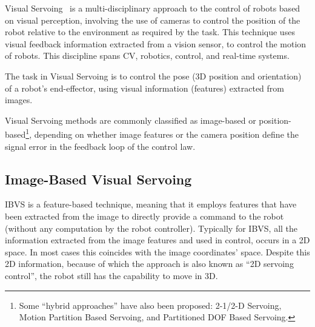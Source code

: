 Visual Servoing~\cite{corke} is a multi-disciplinary approach to the control of robots based on visual perception, involving the use of cameras to control the position of the robot relative to the environment as required by the task. This technique uses visual feedback information extracted from a vision sensor, to control the motion of robots. This discipline spans \ac{CV}, robotics, control, and real-time systems.

The task in Visual Servoing is to control the pose (3D position and orientation) of a robot's end-effector, using visual information (features) extracted from images.

Visual Servoing methods are commonly classified as image-based or position-based\footnote{Some ``hybrid approaches'' have also been proposed: 2-1/2-D Servoing, Motion Partition Based Servoing, and Partitioned DOF Based Servoing.}, depending on whether image features or the camera position define the signal error in the feedback loop of the control law.

\subsection{Image-Based Visual Servoing}

\ac{IBVS} is a feature-based technique, meaning that it employs features that have been extracted from the image to directly provide a command to the robot (without any computation by the robot controller). Typically for \ac{IBVS}, all the information extracted from the image features and used in control, occurs in a 2D space. In most cases this coincides with the image coordinates' space. Despite this 2D information, because of which the approach is also known as ``2D servoing control'', the robot still has the capability to move in 3D.


